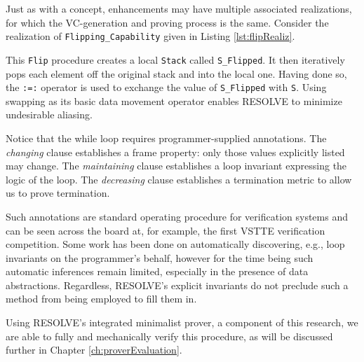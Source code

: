 \mbox{}

Just as with a concept, enhancements may have multiple associated realizations, for which the VC-generation and proving process is the same.  Consider the realization of \texttt{Flipping\_Capability} given in Listing \ref{lst:flipRealiz}.



This \texttt{Flip} procedure creates a local \texttt{Stack} called \texttt{S\_Flipped}.  It then iteratively pops each element off the original stack and into the local one.  Having done so, the \texttt{:=:} operator is used to exchange the value of \texttt{S\_Flipped} with \texttt{S}.  Using swapping as its basic data movement operator enables RESOLVE to minimize undesirable aliasing\cite{harmsSwapping}.

Notice that the while loop requires programmer-supplied annotations.  The \emph{changing} clause establishes a frame property: only those values explicitly listed may change.  The \emph{maintaining} clause establishes a loop invariant expressing the logic of the loop.  The \emph{decreasing} clause establishes a termination metric to allow us to prove termination.

Such annotations are standard operating procedure for verification systems and can be seen across the board at, for example, the first VSTTE verification competition\cite{klebanovVSTTEExperience}.  Some work has been done on automatically discovering, e.g., loop invariants on the programmer's behalf\cite{ernstInfer}, however for the time being such automatic inferences remain limited, especially in the presence of data abstractions.  Regardless, RESOLVE's explicit invariants do not preclude such a method from being employed to fill them in.

Using RESOLVE's integrated minimalist prover, a component of this research, we are able to fully and mechanically verify this procedure, as will be discussed further in Chapter \ref{ch:proverEvaluation}.
